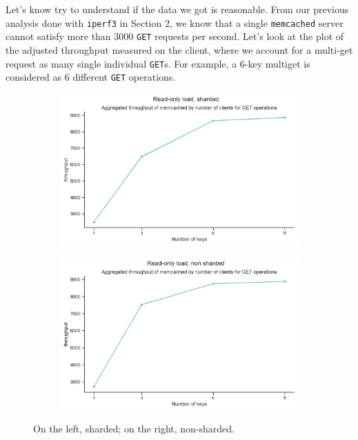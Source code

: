 \documentclass[11pt,a4paper]{article}
\renewcommand{\t}[1]{%
	{\texttt{#1}}}
\begin{document}
Let's know try to understand if the data we got is reasonable.
From our previous analysis done with \t{iperf3} in Section 2, 
we know that a single \t{memcached} server cannot satisfy more
than 3000 \t{GET} requests per second. 
Let's look at the plot of the adjusted throughput measured on the client,
where we account for a multi-get request as many single individual \t{GET}s.
For example, a 6-key multiget is considered as 6 different \t{GET} operations.

\begin{figure}[H]
	\begin{subfigure}[b]{0.5\linewidth}
		\includegraphics[width=\linewidth]{images/gets_2/adjusted_throughput.pdf}
	\end{subfigure}
	\begin{subfigure}[b]{0.5\linewidth}
		\includegraphics[width=\linewidth]{images/gets_1/adjusted_throughput.pdf}
	\end{subfigure}
	\caption{On the left, sharded; on the right, non-sharded.}
	\label{fig:oddioo}
\end{figure}
\end{document}
